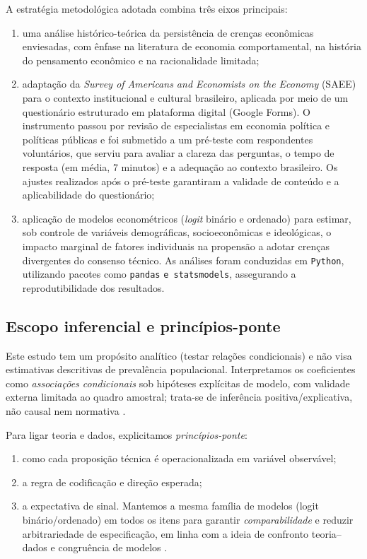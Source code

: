 A estratégia metodológica adotada combina três eixos principais:
\begin{enumerate}[label=\alph*)]
    \item uma análise histórico-teórica da persistência de crenças econômicas enviesadas, com ênfase na literatura de economia comportamental, na história do pensamento econômico e na racionalidade limitada;
    \item adaptação da \textit{Survey of Americans and Economists on the Economy} (SAEE) para o contexto institucional e cultural brasileiro, aplicada por meio de um questionário estruturado em plataforma digital (Google Forms). O instrumento passou por revisão de especialistas em economia política e políticas públicas e foi submetido a um pré-teste com respondentes voluntários, que serviu para avaliar a clareza das perguntas, o tempo de resposta (em média, 7 minutos) e a adequação ao contexto brasileiro. Os ajustes realizados após o pré-teste garantiram a validade de conteúdo e a aplicabilidade do questionário;
    \item aplicação de modelos econométricos (\textit{logit} binário e ordenado) para estimar, sob controle de variáveis demográficas, socioeconômicas e ideológicas, o impacto marginal de fatores individuais na propensão a adotar crenças divergentes do consenso técnico. As análises foram conduzidas em \texttt{Python}, utilizando pacotes como \texttt{pandas} \texttt{e statsmodels}, assegurando a reprodutibilidade dos resultados.
\end{enumerate}

\subsection{Escopo inferencial e princípios-ponte}\label{sec:escopo-inferencial}

Este estudo tem um propósito analítico (testar relações condicionais) e não visa estimativas descritivas de prevalência populacional. Interpretamos os coeficientes como \textit{associações condicionais} sob hipóteses explícitas de modelo, com validade externa limitada ao quadro amostral; trata-se de inferência positiva/explicativa, não causal nem normativa \cite{hausman2008}.

Para ligar teoria e dados, explicitamos \textit{princípios-ponte}:

\begin{enumerate}[label=\roman*)]
    \item como cada proposição técnica é operacionalizada em variável observável;
    \item a regra de codificação e direção esperada;
    \item a expectativa de sinal. Mantemos a mesma família de modelos (logit binário/ordenado) em todos os itens para garantir \textit{comparabilidade} e reduzir arbitrariedade de especificação, em linha com a ideia de confronto teoria–dados e congruência de modelos \cite{stigum2003}.
\end{enumerate}

